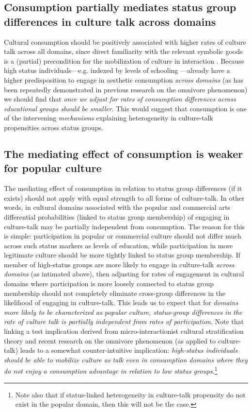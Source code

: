 {\subsection{Consumption partially mediates status group differences in culture talk across domains}
Cultural consumption should be positively associated with higher rates of culture talk across all domains, since direct familiarity with the relevant symbolic goods is a (partial) precondition for the mobilization of culture in interaction \citep{dimaggio87}. Because high status individuals---e.g. indexed by levels of schooling \citep{bourdieu84, bourdieu_darbel91, meyer77}---already have a higher predisposition to engage in aesthetic consumption \emph{across domains} (as has been repeatedly demonstrated in previous research on the omnivore phenomenon) we should find that \emph{once we adjust for rates of consumption differences across educational groups should be smaller}. This would suggest that consumption is one of the intervening \emph{mechanisms} explaining heterogeneity in culture-talk propensities across status groups. 

\subsection{The mediating effect of consumption is weaker for popular culture}
The mediating effect of consumption in relation to status group differences (if it exists) should not apply with equal strength to all forms of culture-talk. In other words, in cultural domains associated with the popular and commercial arts differential probabilities (linked to status group membership) of engaging in culture-talk may be partially independent from consumption.  The reason for this is simple: participation in popular or commercial culture should not differ much across such status markers as levels of education, while participation in more legitimate culture should be more tightly linked to status group membership.  If member of high-status groups are more likely to engage in culture-talk \emph{across domains} (as intimated above), then adjusting for rates of engagement in cultural domains where participation is more loosely connected to status group membership should not completely eliminate cross-group differences in the likelihood of engaging in culture-talk.  This leads us to expect that for \emph{domains more likely to be characterized as popular culture, status-group differences in the rate of culture talk is partially independent from rates of participation}. Note that linking a test implication derived from micro-interactionist cultural stratification theory and recent research on the omnivore phenomenon (as applied to culture-talk) leads to a somewhat counter-intuitive implication: \emph{high-status individuals should be able to mobilize culture as talk even in consumption domains where they do not enjoy a consumption advantage in relation to low status groups}.\footnote{Note also that if status-linked heterogeneity in culture-talk propensity do not exist in the popular domain, then this will not be the case.} 

}
